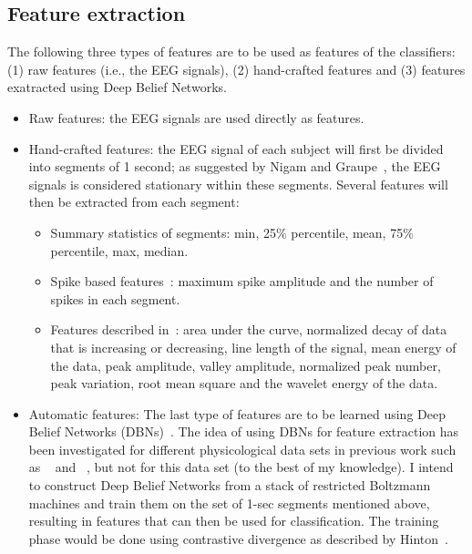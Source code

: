 \documentclass[12pt]{article}
\begin{document}
\subsection{Feature extraction}
The following three types of features are to be used as features of the classifiers: (1) raw features (i.e., the EEG signals), (2) hand-crafted features and (3) features exatracted using Deep Belief Networks.

\begin{itemize}

\item Raw features: the EEG signals are used directly as features.

\item Hand-crafted features: the EEG signal of each subject will first be divided into segments of 1 second; as suggested by Nigam and Graupe~\cite{nigam2004neural}, the EEG signals is considered stationary within these segments. Several features will then be extracted from each segment:
      \begin{itemize}
      \item Summary statistics of segments: min, 25\% percentile, mean, 75\% percentile, max, median.
      \item Spike based features~\cite{nigam2004neural}: maximum spike amplitude and the number of spikes in each segment.
      \item Features described in~\cite{wulsin2011modeling}: area under the curve, normalized decay of data that is increasing or decreasing, line length of the signal, mean energy of the data, peak amplitude, valley amplitude, normalized peak number, peak variation, root mean square and the wavelet energy of the data.
      \end{itemize}

\item Automatic features: The last type of features are to be learned using Deep Belief Networks (DBNs)~\cite{hinton2006reducing}. The idea of using DBNs for feature extraction has been investigated for different physicological data sets in previous work such as ~\cite{langkvist2012sleep} and ~\cite{wulsin2011modeling}, but not for this data set (to the best of my knowledge). I intend to construct Deep Belief Networks from a stack of restricted Boltzmann machines and train them on the set of 1-sec segments mentioned above, resulting in features that can then be used for classification. The training phase would be done using contrastive divergence as described by Hinton~\cite{hinton2006training}.

\end{itemize}
\end{document}
